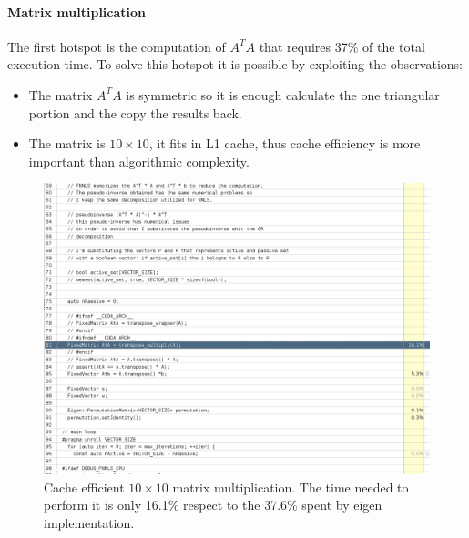 \paragraph{Matrix multiplication}
The first hotspot is the computation of $A^TA$ that requires 37\% of the total execution time. To solve this hotspot it is possible by exploiting the observations:
\begin{itemize}
    \item The matrix $A^TA$ is symmetric so it is enough calculate the one triangular portion and the copy the results back.
    \item The matrix is $10 \times 10$, it fits in L1 cache, thus cache efficiency is more important than algorithmic complexity.
\end{itemize}
\begin{figure}[ht]
  \includegraphics[width=\textwidth]{img/vtune_mine}
  \caption{Cache efficient $10 \times 10$ matrix multiplication. The time needed to perform it is only 16.1\% respect to the 37.6\% spent by eigen implementation.}
  \label{img:vtune_mine}
\end{figure}
